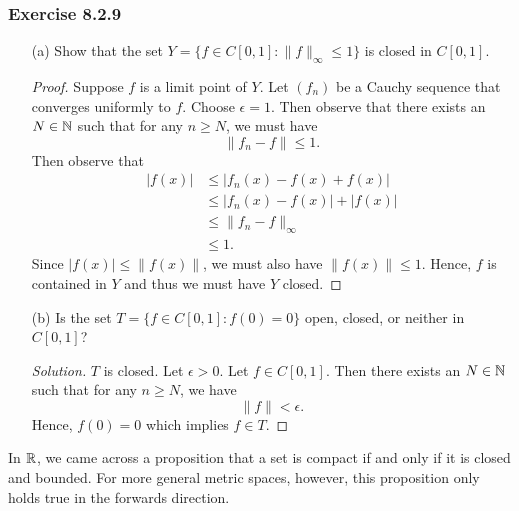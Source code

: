 \subsubsection{Exercise 8.2.9} 
\begin{enumerate}
    \item[(a)] Show that the set \( Y = \{ f \in C[0,1] :  \lVert f \rVert_{\infty } \leq 1  \}  \) is closed in \( C[0,1] \).
        \begin{proof}
        Suppose \( f  \) is a limit point of \( Y  \). Let \( (f_{n}) \) be a Cauchy sequence that converges uniformly to \( f  \). Choose \( \epsilon  =1  \). Then observe that there exists an \( N \in \mathbb{N}  \) such that for any \( n \geq N  \), we must have 
        \[ \lVert f_{n} - f  \rVert \leq 1. \] Then observe that 
        \begin{align*}
            | f(x) | &\leq | f_{n}(x) - f(x) + f(x)  |  \\
                  &\leq | f_{n}(x) - f(x)  | + | f(x)  | \\
                  &\leq \lVert f_{n} - f  \rVert_{\infty } \\
                  &\leq 1.
        \end{align*}
        Since \( | f(x)  |  \leq \lVert  f(x)  \rVert  \), we must also have \( \lVert f(x)  \rVert \leq 1  \).
        Hence, \( f  \) is contained in \( Y  \) and thus we must have \( Y  \) closed.
        \end{proof}
    \item[(b)] Is the set \( T = \{ f \in C[0,1] : f(0) = 0  \}  \) open, closed, or neither in \( C[0,1] \)? 
        \begin{proof}[Solution]
            \( T  \) is closed. Let \( \epsilon > 0  \). Let \( f \in C[0,1] \). Then there exists an  \( N \in \mathbb{N}   \) such that for any \( n \geq N  \), we have 
        \[ \lVert f  \rVert < \epsilon.   \] Hence, \( f(0) = 0  \) which implies \( f \in T \).
        \end{proof}
\end{enumerate}




In \( \mathbb{R}  \), we came across a proposition that a set is compact if and only if it is closed and bounded. For more general metric spaces, however, this proposition only holds true in the forwards direction.



